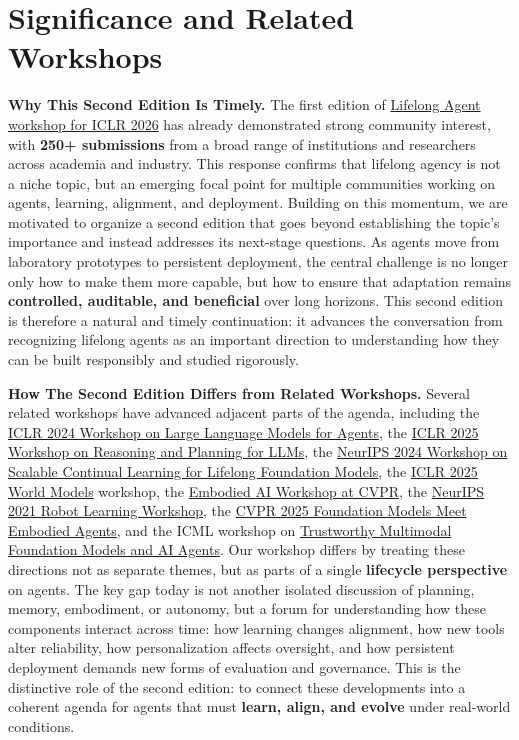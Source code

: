 \vspace{-1.5mm}
\section{Significance and Related Workshops}
\vspace{-2mm}

\noindent\textbf{Why This Second Edition Is Timely.}
The first edition of \href{https://lifelongagent.github.io/}{Lifelong Agent workshop for ICLR 2026} has already demonstrated strong community interest, with \textbf{250+ submissions} from a broad range of institutions and researchers across academia and industry. This response confirms that lifelong agency is not a niche topic, but an emerging focal point for multiple communities working on agents, learning, alignment, and deployment. Building on this momentum, we are motivated to organize a second edition that goes beyond establishing the topic’s importance and instead addresses its next-stage questions. As agents move from laboratory prototypes to persistent deployment, the central challenge is no longer only how to make them more capable, but how to ensure that adaptation remains \textbf{controlled, auditable, and beneficial} over long horizons. This second edition is therefore a natural and timely continuation: it advances the conversation from recognizing lifelong agents as an important direction to understanding how they can be built responsibly and studied rigorously.

\noindent\textbf{How The Second Edition Differs from Related Workshops.}
Several related workshops have advanced adjacent parts of the agenda, including the \href{https://llmagents.github.io/}{ICLR 2024 Workshop on Large Language Models for Agents}, the \href{https://workshop-llm-reasoning-planning.github.io/}{ICLR 2025 Workshop on Reasoning and Planning for LLMs}, the \href{https://sites.google.com/view/continual-fomo-workshop}{NeurIPS 2024 Workshop on Scalable Continual Learning for Lifelong Foundation Models}, the \href{https://sites.google.com/view/worldmodel-iclr2025/}{ICLR 2025 World Models} workshop, the \href{https://embodied-ai.org/}{Embodied AI Workshop at CVPR}, the \href{https://robot-learning.ml/2021/}{NeurIPS 2021 Robot Learning Workshop}, the \href{https://foundation-models-meet-embodied-agents.github.io/cvpr2025/}{CVPR 2025 Foundation Models Meet Embodied Agents}, and the ICML workshop on \href{https://icml-tifa.github.io/}{Trustworthy Multimodal Foundation Models and AI Agents}. Our workshop differs by treating these directions not as separate themes, but as parts of a single \textbf{lifecycle perspective} on agents. The key gap today is not another isolated discussion of planning, memory, embodiment, or autonomy, but a forum for understanding how these components interact across time: how learning changes alignment, how new tools alter reliability, how personalization affects oversight, and how persistent deployment demands new forms of evaluation and governance. This is the distinctive role of the second edition: to connect these developments into a coherent agenda for agents that must \textbf{learn, align, and evolve} under real-world conditions.

